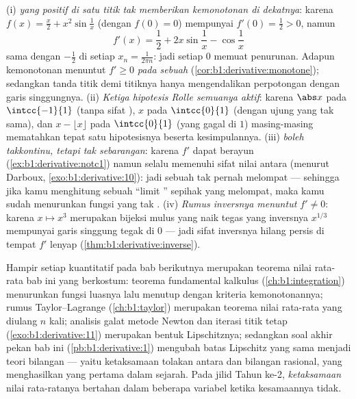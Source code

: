 \begin{remark}
(i) \emph{ yang positif di satu titik tak memberikan
kemonotonan di dekatnya}: karena $f(x) = \frac x2 + x^2\sin\frac1x$ (dengan
$f(0) = 0$) mempunyai $f'(0) = \frac12 > 0$, namun
\[
f'(x) = \frac12 + 2x\sin\frac1x - \cos\frac1x
\]
sama dengan $-\frac12$ di setiap $x_n = \frac{1}{2\pi n}$: jadi setiap
 $0$ memuat penurunan. Adapun kemonotonan menuntut $f'
\geq 0$ \emph{pada sebuah }
(\cref{cor:b1:derivative:monotone}); sedangkan tanda titik demi titiknya hanya
mengendalikan perpotongan dengan garis singgungnya. (ii) \emph{Ketiga
hipotesis Rolle semuanya aktif}: karena $\abs x$ pada $\intcc{-1}{1}$
(tanpa sifat  ), $x$ pada $\intcc{0}{1}$ (dengan ujung yang tak
sama), dan $x - \lfloor x\rfloor$ pada $\intcc{0}{1}$ (yang 
gagal di $1$) masing-masing mematahkan tepat satu hipotesisnya beserta
kesimpulannya. (iii) \emph{ boleh takkontinu, tetapi
tak sebarangan}: karena $f'$ dapat berayun
(\cref{ex:b1:derivative:notc1}) namun selalu memenuhi
sifat nilai antara (menurut Darboux,
\cref{exo:b1:derivative:10}): jadi sebuah  tak pernah melompat --- sehingga jika
kamu menghitung sebuah ``limit '' sepihak yang melompat, maka kamu
sudah menurunkan fungsi yang tak . (iv) \emph{Rumus
inversnya menuntut $f' \neq 0$}: karena $x \mapsto x^3$ merupakan bijeksi mulus
yang naik tegas yang inversnya $x^{1/3}$ mempunyai
garis singgung tegak di $0$ --- jadi sifat  inversnya
hilang persis di tempat $f'$ lenyap
(\cref{thm:b1:derivative:inverse}).
\end{remark}

\begin{remark}
Hampir setiap  kuantitatif pada bab berikutnya merupakan
teorema nilai rata-rata bab ini yang berkostum: teorema fundamental
kalkulus (\cref{ch:b1:integration}) menurunkan fungsi
luasnya lalu menutup dengan kriteria kemonotonannya; rumus
Taylor--Lagrange (\cref{ch:b1:taylor}) merupakan teorema nilai rata-rata
yang diulang $n$ kali; analisis galat metode Newton
dan iterasi titik tetap (\cref{exo:b1:derivative:11}) merupakan
bentuk Lipschitznya; sedangkan soal akhir pekan bab ini
(\cref{pb:b1:derivative:1}) mengubah batas Lipschitz yang sama menjadi
teori bilangan --- yaitu ketaksamaan tolakan antara 
dan bilangan rasional, yang menghasilkan  yang pertama
dalam sejarah. Pada jilid Tahun ke-2, \emph{ketaksamaan} nilai
rata-ratanya bertahan dalam beberapa variabel ketika kesamaannya
tidak.
\end{remark}

